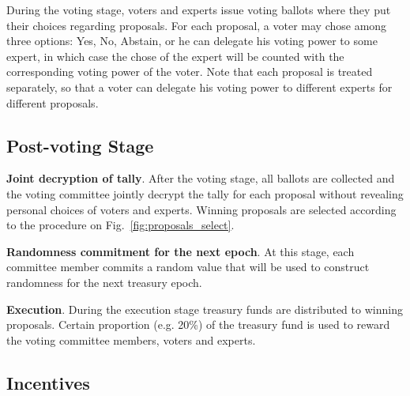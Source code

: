During the voting stage, voters and experts issue voting ballots where they put their choices regarding proposals. For each proposal, a voter may chose among three options: Yes, No, Abstain, or he can delegate his voting power to some expert, in which case the chose of the expert will be counted with the corresponding voting power of the voter.
Note that each proposal is treated separately, so that a voter can delegate his voting power to different experts for different proposals.

\subsection{Post-voting Stage}

\textbf{Joint decryption of tally}. After the voting stage, all ballots are collected and the voting committee jointly decrypt the tally for each proposal without revealing personal choices of voters and experts. Winning proposals are selected according to the procedure on Fig.~\ref{fig:proposals_select}.


\newpage
\textbf{Randomness commitment for the next epoch}. At this stage, each committee member commits a random value that will be used to construct randomness for the next treasury epoch.

\textbf{Execution}. During the execution stage treasury funds are distributed to winning proposals. Certain proportion (e.g. 20\%) of the treasury fund is used to reward the voting committee members, voters and experts.

\subsection{Incentives}

